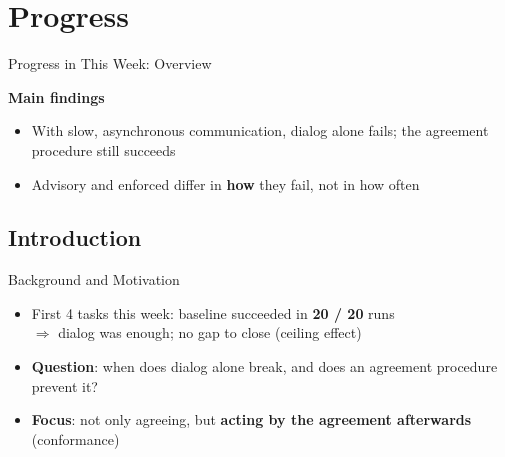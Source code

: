 \documentclass[aspectratio=169,11pt]{beamer}
\begin{document}
\section{Progress}
\begin{frame}{Progress in This Week: Overview}
  \centering

  \vspace{1em}
  \pause
  \small
  \textbf{Main findings}
  \begin{itemize}
    \item With slow, asynchronous communication, dialog alone fails; the agreement procedure still succeeds
    \pause
    \item Advisory and enforced differ in \textbf{how} they fail, not in how often
  \end{itemize}
\end{frame}

\subsection{Introduction}
\begin{frame}{Background and Motivation}
  \small
  \begin{itemize}
    \item First 4 tasks this week: baseline succeeded in \textbf{20 / 20} runs\\
      $\Rightarrow$ dialog was enough; no gap to close (ceiling effect)
    \pause
    \item \textbf{Question}: when does dialog alone break, and does an agreement procedure prevent it?
    \pause
    \item \textbf{Focus}: not only agreeing, but \textbf{acting by the agreement afterwards} (conformance)
  \end{itemize}
\end{frame}
\end{document}
